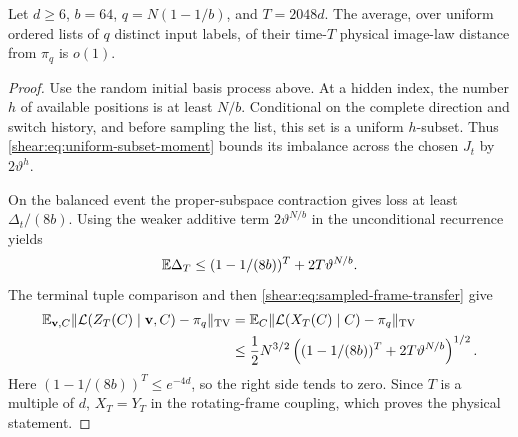 \begin{lemma}
\label{frames:average-law}
Let $d\ge6$, $b=64$, $q=N(1-1/b)$, and $T=2048d$. The
average, over uniform ordered lists of $q$ distinct input
labels, of their time-$T$ physical image-law distance from
$\pi_q$ is $o(1)$.
\end{lemma}
\begin{proof}
Use the random initial basis process above. At a hidden index,
the number $h$ of available positions is at least $N/b$.
Conditional on the complete direction and switch history, and
before sampling the list, this set is a uniform $h$-subset.
Thus \eqref{shear:eq:uniform-subset-moment} bounds its imbalance
across the chosen $J_t$ by $2\vartheta^h$.

On the balanced event the proper-subspace contraction gives
loss at least $\Delta_t/(8b)$. Using the weaker additive term
$2\vartheta^{N/b}$ in the unconditional recurrence yields
\[
 \mathbb E\Delta_T\le(1-1/(8b))^T+2T\vartheta^{N/b}.
\]
The terminal tuple comparison and then
\eqref{shear:eq:sampled-frame-transfer} give
\begin{align}
 \mathbb E_{\mathbf v,C}
 \|\mathcal L(Z_T(C)\mid\mathbf v,C)-\pi_q\|_{\mathrm{TV}}
 &=\mathbb E_C\|\mathcal L(X_T(C)\mid C)-\pi_q\|_{\mathrm{TV}}\notag\\
 &\le\frac12N^{3/2}
 \left((1-1/(8b))^T+2T\vartheta^{N/b}\right)^{1/2}.
 \label{frames:average-tv}
\end{align}
Here $(1-1/(8b))^T\le e^{-4d}$, so the right side tends to
zero. Since $T$ is a multiple of $d$, $X_T=Y_T$ in the
rotating-frame coupling, which proves the physical statement.
\end{proof}
